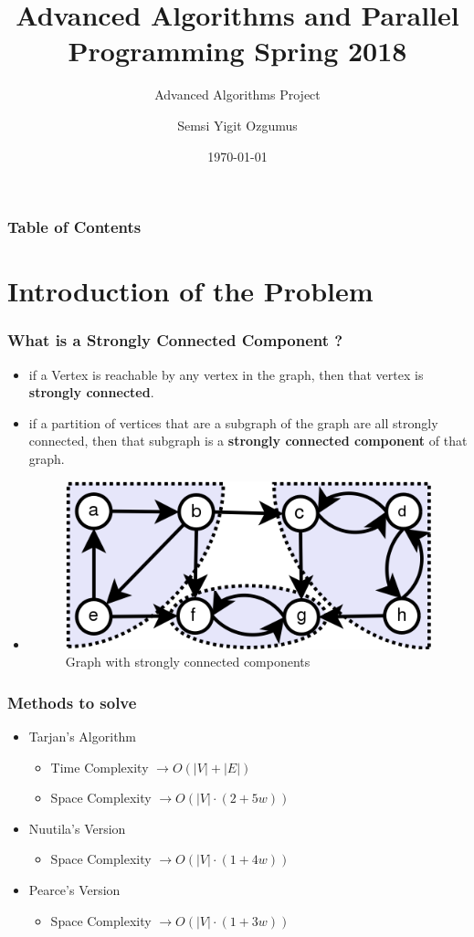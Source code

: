 \documentclass{beamer}
\title{Advanced Algorithms and Parallel Programming Spring 2018}
\subtitle{Advanced Algorithms Project}
\author{Semsi Yigit Ozgumus}
\institute{Politecnico di Milano}
\date{\today}
\begin{document}
	\begin{frame}
		\titlepage
	\end{frame}

	\begin{frame}
		\frametitle{Table of Contents}
		\tableofcontents
	\end{frame}
	
	\section{Introduction of the Problem}
		\begin{frame}
			\frametitle{What is a Strongly Connected Component ?}
			
			\begin{itemize}
				\item<2-> if a Vertex is reachable by any vertex in the graph, then that vertex is \textbf{strongly connected}.
				\item <3-> if a partition of vertices that are a subgraph of the graph are all strongly connected, then that subgraph is a \textbf{strongly connected component} of that graph.
				\item <4-> 	\begin{figure}[h!]
					\centering
					\includegraphics[width=.6\textwidth]{scc}
					\caption{Graph with strongly connected components}
				\end{figure}
			\end{itemize}
		\end{frame}
		
		\begin{frame}
			\frametitle{Methods to solve}
			\begin{itemize}
				\item <2-> Tarjan's Algorithm
				 \begin{itemize}
					\item <3-> Time Complexity $\rightarrow O(| V | + | E |)$
					\item <4-> Space Complexity $\rightarrow O(|V| \cdot (2 + 5 w)) $
				\end{itemize}
				\item <5-> Nuutila's Version
					\begin{itemize}
						\item <6-> Space Complexity  $\rightarrow O(|V| \cdot (1 + 4 w)) $
					\end{itemize}
				\item <7-> Pearce's Version
					\begin{itemize}
						\item <8-> Space Complexity  $\rightarrow O(|V| \cdot (1 + 3 w)) $
					\end{itemize}
			\end{itemize}
		\end{frame}
	
\end{document}
